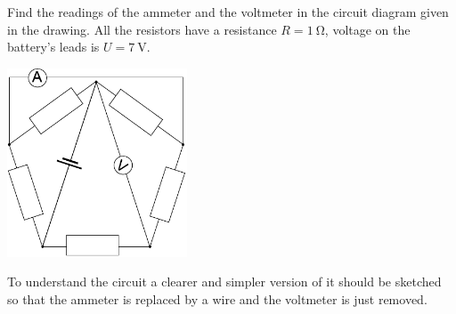 {\ifEngStatement
Find the readings of the ammeter and the voltmeter in the circuit diagram given in the drawing. All the resistors have a resistance $R=\SI{1}{\ohm}$, voltage on the battery’s leads is $U=\SI{7}{\volt}$. 
\begin{center}
	\includegraphics[width=0.4\textwidth]{2017-v3g-06-viisnurk}
\end{center}
\fi


\ifEngHint
To understand the circuit a clearer and simpler version of it should be sketched so that the ammeter is replaced by a wire and the voltmeter is just removed.
\fi


}
